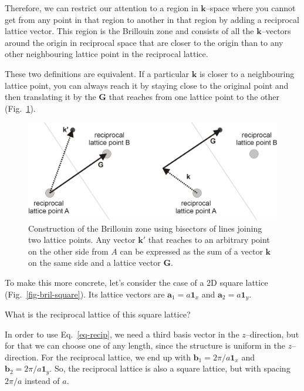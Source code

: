 Therefore, we can restrict our attention to a region in ${\mathbf k}$--space where you cannot get from any point in that region to another in that region by adding a reciprocal lattice vector. This region is the Brillouin zone and consists of all the ${\mathbf k}$--vectors around the origin in reciprocal space that are closer to the origin than to any other neighbouring lattice point in the reciprocal lattice.

These two definitions are equivalent. If a particular ${\mathbf k}$ is closer to a neighbouring lattice point, you can always reach it by staying close to the original point and then translating it by the ${\mathbf G}$ that reaches from one lattice point to the other (Fig.~\ref{fig-bril-bisector}).

\begin{figure}[H]
\centering
\includegraphics{symmetry/figures/bisector}
\caption{Construction of the Brillouin zone using bisectors of lines joining two lattice points. Any vector ${\mathbf k}'$ that reaches to an arbitrary point on the other side from $A$ can be expressed as the sum of a vector ${\mathbf k}$ on the same side and a lattice vector ${\mathbf G}$.}
\label{fig-bril-bisector}
\end{figure}

To make this more concrete, let's consider the case of a 2D square lattice (Fig.~\ref{fig-bril-square}). Its lattice vectors are ${\mathbf a}_1 = a {\mathbf 1}_x$ and ${\mathbf a}_2 = a {\mathbf 1}_y$.

\begin{cue}
  What is the reciprocal lattice of this square lattice?
\end{cue}

In order to use Eq.~\ref{eq-recip}, we need a third basis vector in the $z$--direction, but for that we can choose one of any length, since the structure is uniform in the $z$--direction. For the reciprocal lattice, we end up with  ${\mathbf b}_1 = 2 \pi / a {\mathbf 1}_x$ and ${\mathbf b}_2 = 2 \pi / a {\mathbf 1}_y$. So, the reciprocal lattice is also a square lattice, but with spacing $2 \pi / a$ instead of $a$.

